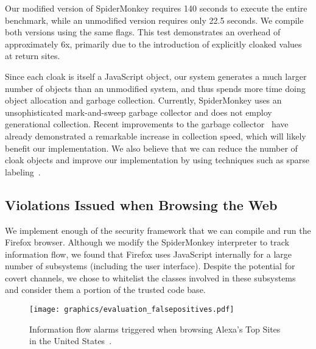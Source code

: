 \documentclass[preprint]{sigplanconf}
\begin{document}
Our modified version of SpiderMonkey requires 140 seconds to execute the entire benchmark, while an unmodified version requires only 22.5 seconds.
We compile both versions using the same flags.
This test demonstrates an overhead of approximately 6x, primarily due to the introduction of explicitly cloaked values at return sites.

Since each cloak is itself a JavaScript object, our system generates a much larger number of objects than an unmodified system, and thus spends more time doing object allocation and garbage collection.
Currently, SpiderMonkey uses an unsophisticated mark-and-sweep garbage collector and does not employ generational collection.
Recent improvements to the garbage collector~\cite{wagner2011} have already demonstrated a remarkable increase in collection speed, which will likely benefit our implementation.
We also believe that we can reduce the number of cloak objects and improve our implementation by using techniques such as sparse labeling~\cite{1554353,1814220}.


\subsection{Violations Issued when Browsing the Web}
We implement enough of the security framework that we can compile and run the Firefox browser.
Although we modify the SpiderMonkey interpreter to track information flow, we found that Firefox uses JavaScript internally for a large number of subsystems (including the user interface).
Despite the potential for covert channels, we chose to whitelist the classes involved in these subsystems and consider them a portion of the trusted code base.

\begin{figure}[ht]
  \centerline{\texttt{[image: graphics/evaluation\_falsepositives.pdf]}}
  \caption{Information flow alarms triggered when browsing Alexa's Top Sites in the United States~\cite{alexa}.}
  \label{fig:eval_falsepositives}
\end{figure}
\end{document}
